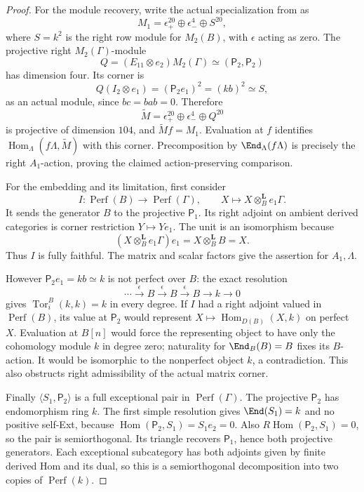 \begin{proof}
For the module recovery, write the actual specialization from
 as
\[
 M_1=\epsilon_+^{20}\oplus\epsilon_-^4\oplus S^{20},
\]
where $S=k^2$ is the right row module for $M_2(B)$, with
$\epsilon$ acting as zero. The projective right $M_2(\Gamma)$-module
\[
 Q=(E_{11}\otimes e_2)M_2(\Gamma)
     \simeq(\mathsf P_2,\mathsf P_2)
\]
has dimension four. Its corner is
\[
 Q(I_2\otimes e_1)=(\mathsf P_2e_1)^2
       =(kb)^2\simeq S,
\]
as an actual module, since $bc=bab=0$. Therefore
\[
 \widetilde M=\epsilon_+^{20}\oplus\epsilon_-^4\oplus Q^{20}
\]
is projective of dimension $104$, and
$\widetilde M f=M_1$. Evaluation at $f$ identifies
$\operatorname{Hom}_\Lambda(f\Lambda,\widetilde M)$ with this
corner. Precomposition by $\End_\Lambda(f\Lambda)$ is precisely
the right $A_1$-action, proving the claimed action-preserving
comparison.

For the embedding and its limitation, first consider
\[
 I:\operatorname{Perf}(B)\longrightarrow\operatorname{Perf}(\Gamma),
 \qquad X\longmapsto X\otimes_B^{\mathbf L}e_1\Gamma.
\]
It sends the generator $B$ to the projective $\mathsf P_1$.
Its right adjoint on ambient derived categories is corner
restriction $Y\mapsto Ye_1$. The unit is an isomorphism because
\[
 (X\otimes_B^{\mathbf L}e_1\Gamma)e_1
       =X\otimes_B^{\mathbf L}B=X.
\]
Thus $I$ is fully faithful. The matrix and scalar factors give
the assertion for $A_1,\Lambda$.

However $\mathsf P_2e_1=kb\simeq k$ is not perfect over $B$:
the exact resolution
\[
 \cdots\xrightarrow{\epsilon}B\xrightarrow{\epsilon}B
   \xrightarrow{\epsilon}B\longrightarrow k\longrightarrow0
\]
gives $\operatorname{Tor}^B_i(k,k)=k$ in every degree.
If $I$ had a right adjoint valued in $\operatorname{Perf}(B)$,
its value at $\mathsf P_2$ would represent
$X\mapsto\operatorname{Hom}_{D(B)}(X,k)$ on perfect $X$.
Evaluation at $B[n]$ would force the representing object to
have only the cohomology module $k$ in degree zero; naturality
for $\End_B(B)=B$ fixes its $B$-action. It would be isomorphic
to the nonperfect object $k$, a contradiction. This also
obstructs right admissibility of the actual matrix corner.

Finally $\langle S_1,\mathsf P_2\rangle$ is a full exceptional
pair in $\operatorname{Perf}(\Gamma)$.
The projective $\mathsf P_2$ has endomorphism ring $k$.
The first simple resolution gives
$\End(S_1)=k$ and no positive self-Ext, because
$\operatorname{Hom}(\mathsf P_2,S_1)=S_1e_2=0$.
Also $R\operatorname{Hom}(\mathsf P_2,S_1)=0$, so the pair
is semiorthogonal. Its triangle recovers $\mathsf P_1$, hence
both projective generators. Each exceptional subcategory has
both adjoints given by finite derived Hom and its dual, so this
is a semiorthogonal decomposition into two copies of
$\operatorname{Perf}(k)$.


\end{proof}
